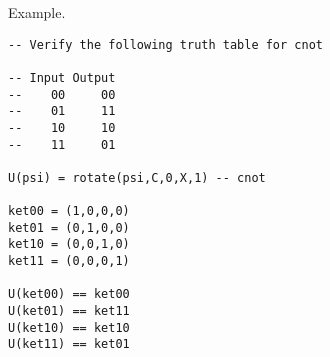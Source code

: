 \noindent
Example.
{\color{blue}
\begin{verbatim}
-- Verify the following truth table for cnot

-- Input Output
--    00     00
--    01     11
--    10     10
--    11     01

U(psi) = rotate(psi,C,0,X,1) -- cnot

ket00 = (1,0,0,0)
ket01 = (0,1,0,0)
ket10 = (0,0,1,0)
ket11 = (0,0,0,1)

U(ket00) == ket00
U(ket01) == ket11
U(ket10) == ket10
U(ket11) == ket01
\end{verbatim}}
